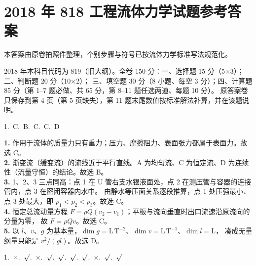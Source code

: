 \chapter{2018 年 818 工程流体力学试题参考答案}

\begin{tishi}本答案由原卷拍照件整理，个别步骤与符号已按流体力学标准写法规范化。\end{tishi}

\begin{tishi}
2018 年本科目代码为 819（旧大纲）。全卷 150 分：一、选择题 15 分（5×3）；二、判断题 20 分（10×2）；
三、填空题 30 分（8 小题、每空 3 分）；四、计算题 85 分（第 1--7 题必做、共 65 分，第 8--11 题任选两道、每题 10 分）。
原答案卷只保存到第 4 页（第 5 页缺失），第 11 题末尾数值按标准解法补算，并在该题说明。
\end{tishi}


\begin{center}
1.~C.~B.~C.~C.~D
\end{center}

\begin{tishi}
\textbf{1.} 作用于流体的质量力只有重力；压力、摩擦阻力、表面张力都属于表面力。故选 C。\\
\textbf{2.} 渐变流（缓变流）的流线近于平行直线。A 为均匀流、C 为恒定流、D 为连续性（流量守恒）的结论。故选 B。\\
\textbf{3.} 1、2、3 三点同高：点 1 在 U 管右支水银液面处，点 2 在测压管与容器的连接管内，点 3 在密闭容器内水中。
由静水等压面关系逐段推算，点 1 处压强最小、点 3 处最大，即 $p_1<p_2<p_3$。故选 C。\\
\textbf{4.} 恒定总流动量方程 $F=\rho Q\left(v_2-v_1\right)$；平板与流向垂直时出口流速沿原流向的分量为零，
故 $F=\rho Qv$。故选 C。\\
\textbf{5.} 以 $l$、$v$、$g$ 为基本量，$\dim g=\mathrm{L\,T^{-2}}$、$\dim v=\mathrm{L\,T^{-1}}$、$\dim l=\mathrm{L}$，
凑成无量纲量只能是 $v^2/(gl)$。故选 D。
\end{tishi}


\begin{center}
1.~$\times$.~$\surd$.~$\times$.~$\surd$.~$\surd$.~$\surd$.~$\surd$.~$\times$.~$\surd$.~$\surd$
\end{center}

